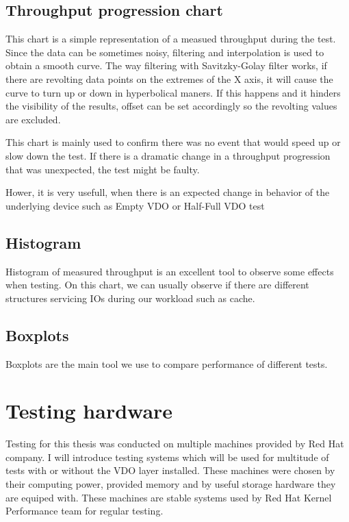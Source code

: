 \documentclass[
  color, %
  table, %
  lof,   %
  lot,   %
]{fithesis3}
\begin{document}
\subsection{Throughput progression chart}
This chart is a simple representation of a measued throughput during the test. Since the data can be sometimes noisy, filtering and interpolation is used to obtain a smooth curve. The way filtering with Savitzky-Golay filter works, if there are revolting data points on the extremes of the X axis, it will cause the curve to turn up or down in hyperbolical maners. If this happens and it hinders the visibility of the results, offset can be set accordingly so the revolting values are excluded.

This chart is mainly used to confirm there was no event that would speed up or slow down the test. If there is a dramatic change in a throughput progression that was unexpected, the test might be faulty.

Hower, it is very usefull, when there is an expected change in behavior of the underlying device such as Empty VDO or Half-Full VDO test

\subsection{Histogram}
Histogram of measured throughput is an excellent tool to observe some effects when testing. On this chart, we can usually observe if there are different structures servicing IOs during our workload such as cache.

\subsection{Boxplots}
Boxplots are the main tool we use to compare performance of different tests.

\section{Testing hardware}
Testing for this thesis was conducted on multiple machines provided by Red Hat company. I will introduce testing systems which will be used for multitude of tests with or without the VDO layer installed. These machines were chosen by their computing power, provided memory and by useful storage hardware they are equiped with. These machines are stable systems used by Red Hat Kernel Performance team for regular testing.

\label{machines}
\end{document}
